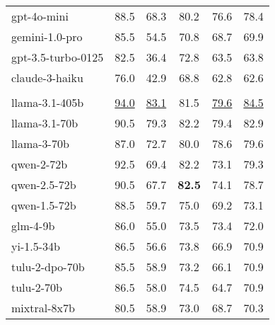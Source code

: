\begin{table}[t!]
\begin{tabular}{@{}lccccc@{}}
\rowcolor{close} gpt-4o-mini        & 88.5             & 68.3                 & 80.2          & 76.6            & 78.4          \\
\rowcolor{close} gemini-1.0-pro     & 85.5             & 54.5                 & 70.8          & 68.7            & 69.9          \\
\rowcolor{close} gpt-3.5-turbo-0125 & 82.5             & 36.4                 & 72.8          & 63.5            & 63.8          \\
\rowcolor{close} claude-3-haiku     & 76.0             & 42.9                 & 68.8          & 62.8            & 62.6          \\ 
\rowcolor{openrow!20}\multicolumn{6}{l}{Open-source LLMs}  \\ 
\rowcolor{open} llama-3.1-405b     & \underline{94.0}             & \underline{83.1}                 & 81.5          & \underline{79.6}            & \underline{84.5}          \\
\rowcolor{open} llama-3.1-70b      & 90.5             & 79.3                 & 82.2 & 79.4            & 82.9          \\
\rowcolor{open} llama-3-70b        & 87.0             & 72.7                 & 80.0          & 78.6            & 79.6          \\
\rowcolor{open} qwen-2-72b         & 92.5             & 69.4                 & 82.2 & 73.1            & 79.3          \\
\rowcolor{open} qwen-2.5-72b       & 90.5             & 67.7                 & \textbf{82.5} & 74.1            & 78.7          \\
\rowcolor{open} qwen-1.5-72b       & 88.5             & 59.7                 & 75.0          & 69.2            & 73.1          \\
\rowcolor{open} glm-4-9b           & 86.0             & 55.0                 & 73.5          & 73.4            & 72.0          \\
\rowcolor{open} yi-1.5-34b         & 86.5             & 56.6                 & 73.8          & 66.9            & 70.9          \\
\rowcolor{open} tulu-2-dpo-70b     & 85.5             & 58.9                 & 73.2          & 66.1            & 70.9          \\
\rowcolor{open} tulu-2-70b         & 86.5             & 58.0                 & 74.5          & 64.7            & 70.9          \\
\rowcolor{open} mixtral-8x7b       & 80.5             & 58.9                 & 73.0          & 68.7            & 70.3          \\

\end{tabular}
\end{table}
